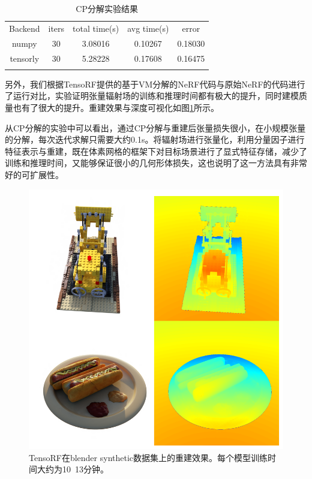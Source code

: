 \documentclass[10pt,twocolumn,letterpaper]{article}
\begin{document}
\begin{table}[h]
	\centering
	\begin{tabular}{ccccc}
		\hline\hline\noalign{\smallskip}	
		Backend & iters & total time(s) & avg time(s) & error  \\
		\noalign{\smallskip}\hline\noalign{\smallskip}
		numpy & 30 & 3.08016 & 0.10267 & 0.18030  \\
		tensorly & 30 & 5.28228 & 0.17608 & 0.16475  \\
		\noalign{\smallskip}\hline
	\end{tabular}
  \caption{CP分解实验结果}
	\label{tab:1}  
\end{table}


另外，我们根据TensoRF提供的基于VM分解的NeRF代码与原始NeRF的代码进行了运行对比，实验证明张量辐射场的训练和推理时间都有极大的提升，同时建模质量也有了很大的提升。重建效果与深度可视化如图\ref{fig:res}所示。

从CP分解的实验中可以看出，通过CP分解与重建后张量损失很小，在小规模张量的分解，每次迭代求解只需要大约0.1s。将辐射场进行张量化，利用分量因子进行特征表示与重建，既在体素网格的框架下对目标场景进行了显式特征存储，减少了训练和推理时间，又能够保证很小的几何形体损失，这也说明了这一方法具有非常好的可扩展性。

\begin{figure}[h]
  \centering
  \includegraphics[width=1.0\linewidth]{fig/res.png}
  \caption{TensoRF在blender synthetic数据集上的重建效果。每个模型训练时间大约为10~13分钟。}
  \label{fig:res}
\end{figure}
\end{document}
